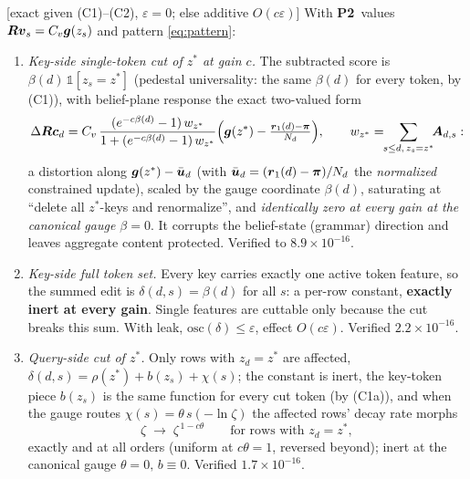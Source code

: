 \documentclass{article}
\newcommand{\gb}{\boldsymbol{g}}
\newcommand{\bped}{\beta}
\newcommand{\ind}{\mathbb{1}}
\newcommand{\htag}[1]{{\normalfont\sffamily\footnotesize[#1]}}
\newcommand{\Ptwo}{\textbf{P2}}
\newcommand{\priorA}{\textsf{[prior-A]}}
\begin{document}
\begin{theorem}[cut calculus; imported \priorA, instantiated]\label{thm:cut}
\htag{exact given (C1)--(C2), $\varepsilon=0$; else additive $O(c\varepsilon)$}
With \Ptwo\ values $\Rb\vb_s=C_v\gb(z_s)$ and pattern \eqref{eq:pattern}:
\begin{enumerate}
\item \emph{Key-side single-token cut of $z^\ast$ at gain $c$.} The subtracted score
is $\bped(d)\,\ind[z_s=z^\ast]$ (pedestal universality: the same $\bped(d)$ for every
token, by (C1)), with belief-plane response the exact two-valued form
\begin{equation}\label{eq:beliefcut}
\Delta\Rb\cb_d=C_v\,\frac{(e^{-c\bped(d)}-1)\,w_{z^\ast}}
{1+(e^{-c\bped(d)}-1)\,w_{z^\ast}}\Bigl(\gb(z^\ast)-\tfrac{\rb_1(d)-\pib}{N_d}\Bigr),
\qquad w_{z^\ast}=\!\!\sum_{s\le d,\,z_s=z^\ast}\!\!\Ab_{d,s}:
\end{equation}
a distortion along $\gb(z^\ast)-\bar\ub_d$ (with $\bar{\boldsymbol{u}}_d=(\boldsymbol{r}_1(d)-\boldsymbol{\pi})/N_d$ the
\emph{normalized} constrained update), scaled by the gauge coordinate $\bped(d)$,
saturating at ``delete all $z^\ast$-keys and renormalize'', and \emph{identically
zero at every gain at the canonical gauge $\bped=0$}. It corrupts the belief-state
(grammar) direction and leaves aggregate content protected. Verified to
$8.9\times10^{-16}$.
\item \emph{Key-side full token set.} Every key carries exactly one active token
feature, so the summed edit is $\delta(d,s)=\bped(d)$ for all $s$: a per-row
constant, \textbf{exactly inert at every gain}. Single features are cuttable only
because the cut breaks this sum. With leak, $\mathrm{osc}(\delta)\le\varepsilon$,
effect $O(c\varepsilon)$. Verified $2.2\times10^{-16}$.
\item \emph{Query-side cut of $z^\ast$.} Only rows with $z_d=z^\ast$ are affected,
$\delta(d,s)=\rho(z^\ast)+b(z_s)+\chi(s)$; the constant is inert, the key-token piece
$b(z_s)$ is the same function for every cut token (by (C1a)), and when the gauge
routes $\chi(s)=\theta\,s(-\ln\zeta)$ the affected rows' decay rate morphs
\begin{equation}\label{eq:morph}
\zeta\;\longrightarrow\;\zeta^{\,1-c\theta}\qquad\text{for rows with }z_d=z^\ast,
\end{equation}
exactly and at all orders (uniform at $c\theta=1$, reversed beyond); inert at the
canonical gauge $\theta=0,\,b\equiv0$. Verified $1.7\times10^{-16}$.
\end{enumerate}
\end{theorem}
\end{document}
